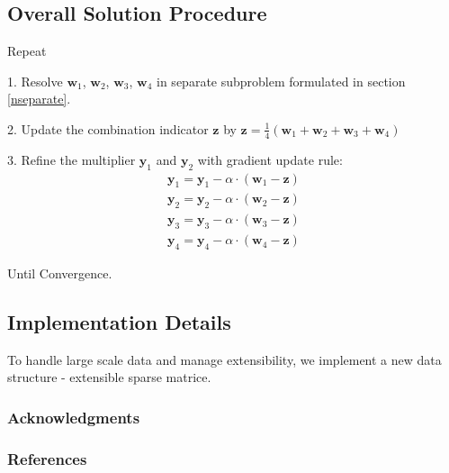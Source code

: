\documentclass{article} %
\newcommand{\wone}{\mathbf{w}_1}
\newcommand{\wtwo}{\mathbf{w}_2}
\newcommand{\wthree}{\mathbf{w}_3}
\newcommand{\wfour}{\mathbf{w}_4}
\newcommand{\yone}{\mathbf{y}_1}
\newcommand{\ytwo}{\mathbf{y}_2}
\newcommand{\ythree}{\mathbf{y}_3}
\newcommand{\yfour}{\mathbf{y}_4}
\newcommand{\z}{\mathbf{z}}
\begin{document}
\subsection{Overall Solution Procedure}
Repeat

1. Resolve $\wone$, $\wtwo$, $\wthree$, $\wfour$ in separate subproblem
formulated in section \ref{nseparate}.

2. Update the combination indicator $\z$ by $\z = \frac{1}{4} (\wone + \wtwo +
\wthree + \wfour)$

3. Refine the multiplier $\yone$ and $\ytwo$ with gradient update rule: 
\begin{align}
\yone = \yone - \alpha \cdot (\wone - \z) \\
\ytwo = \ytwo - \alpha \cdot (\wtwo - \z) \\ 
\ythree = \ythree - \alpha \cdot (\wthree - \z) \\
\yfour = \yfour - \alpha \cdot (\wfour - \z)
\end{align}

Until Convergence.

\subsection{Implementation Details}
To handle large scale data and manage extensibility, we implement a new data
structure - extensible sparse matrice. 

\newpage
\subsubsection*{Acknowledgments}

\subsubsection*{References}
\small{

}
\end{document}
